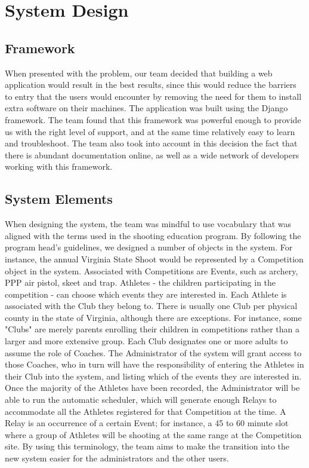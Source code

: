 \documentclass[sigconf]{acmart}
\begin{document}
\section{System Design}

\subsection{Framework}%

When presented with the problem, our team decided that building a web application would result in the best results, since this would reduce the barriers to entry that the users would encounter by removing the need for them to install extra software on their machines. The application was built using the Django framework. The team found that this framework was powerful enough to provide us with the right level of support, and at the same time relatively easy to learn and troubleshoot. The team also took into account in this decision the fact that there is abundant documentation online, as well as a wide network of developers working with this framework.

\subsection{System Elements}%

When designing the system, the team was mindful to use vocabulary that was aligned with the terms used in the shooting education program. By following the program head's guidelines, we designed a number of objects in the system. For instance, the annual Virginia State Shoot would be represented by a Competition object in the system. Associated with Competitions are Events, such as archery, PPP air pistol, skeet and trap. Athletes - the children participating in the competition - can choose which events they are interested in. Each Athlete is associated with the Club they belong to. There is usually one Club per physical county in the state of Virginia, although there are exceptions. For instance, some "Clubs" are merely parents enrolling their children in competitions rather than a larger and more extensive group. Each Club designates one or more adults to assume the role of Coaches. The Administrator of the system will grant access to those Coaches, who in turn will have the responsibility of entering the Athletes in their Club into the system, and listing which of the events they are interested in. Once the majority of the Athletes have been recorded, the Administrator will be able to run the automatic scheduler, which will generate enough Relays to accommodate all the Athletes registered for that Competition at the time. A Relay is an occurrence of a certain Event; for instance, a 45 to 60 minute slot where a group of Athletes will be shooting at the same range at the Competition site. By using this terminology, the team aims to make the transition into the new system easier for the administrators and the other users.
\end{document}
